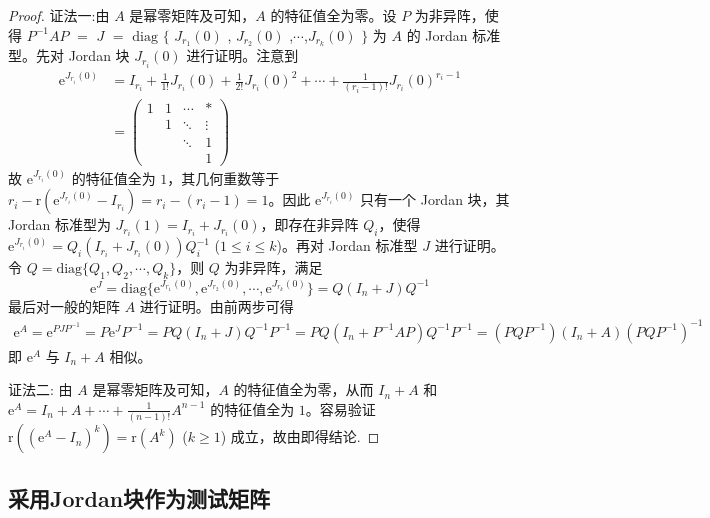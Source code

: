\documentclass[../../main.tex]{subfiles}%
\begin{document}
\begin{proof}

{\color{blue}证法一:}由 $A$ 是幂零矩阵及可知，$A$ 的特征值全为零。设 $P$ 为非异阵，使得 $P^{-1}AP$ $=$ $J$ $=$ $\mathrm{diag}$ $\{$ $J_{r_1}(0)$ , $J_{r_2}(0)$ ,$\cdots$,$J_{r_k}(0)$ $\}$ 为 $A$ 的 Jordan 标准型。先对 Jordan 块 $J_{r_i}(0)$ 进行证明。注意到
\begin{align*}
\mathrm{e}^{J_{r_i}(0)} &= I_{r_i}+\frac{1}{1!}J_{r_i}(0)+\frac{1}{2!}J_{r_i}(0)^2+\cdots+\frac{1}{(r_i - 1)!}J_{r_i}(0)^{r_i - 1}\\
&= 
\begin{pmatrix}
1 & 1 & \cdots & * \\
& 1 & \ddots & \vdots \\
& & \ddots & 1 \\
& & & 1
\end{pmatrix}
\end{align*}
故 $\mathrm{e}^{J_{r_i}(0)}$ 的特征值全为 $1$，其几何重数等于 $r_i - \mathrm{r}(\mathrm{e}^{J_{r_i}(0)}-I_{r_i}) = r_i - (r_i - 1) = 1$。因此 $\mathrm{e}^{J_{r_i}(0)}$ 只有一个 Jordan 块，其 Jordan 标准型为 $J_{r_i}(1) = I_{r_i}+J_{r_i}(0)$，即存在非异阵 $Q_i$，使得 $\mathrm{e}^{J_{r_i}(0)} = Q_i(I_{r_i}+J_{r_i}(0))Q_i^{-1}$ ($1\leqslant  i\leqslant  k$)。再对 Jordan 标准型 $J$ 进行证明。令 $Q = \mathrm{diag}\{Q_1,Q_2,\cdots,Q_k\}$，则 $Q$ 为非异阵，满足
\[
\mathrm{e}^J = \mathrm{diag}\{\mathrm{e}^{J_{r_1}(0)},\mathrm{e}^{J_{r_2}(0)},\cdots,\mathrm{e}^{J_{r_k}(0)}\} = Q(I_n + J)Q^{-1}
\]
最后对一般的矩阵 $A$ 进行证明。由前两步可得
\begin{align*}
\mathrm{e}^A = \mathrm{e}^{PJP^{-1}} = P\mathrm{e}^JP^{-1} = PQ(I_n + J)Q^{-1}P^{-1}= PQ(I_n + P^{-1}AP)Q^{-1}P^{-1} = (PQP^{-1})(I_n + A)(PQP^{-1})^{-1}
\end{align*}
即 $\mathrm{e}^A$ 与 $I_n + A$ 相似。

{\color{blue}证法二:}
由 $A$ 是幂零矩阵及可知，$A$ 的特征值全为零，从而 $I_n + A$ 和 $\mathrm{e}^A = I_n+A+\cdots+\frac{1}{(n - 1)!}A^{n - 1}$ 的特征值全为 $1$。容易验证 $\mathrm{r}((\mathrm{e}^A - I_n)^k) = \mathrm{r}(A^k)$ ($k\geqslant  1$) 成立，故由即得结论.
\end{proof}


\subsection{采用Jordan块作为测试矩阵}
\end{document}
